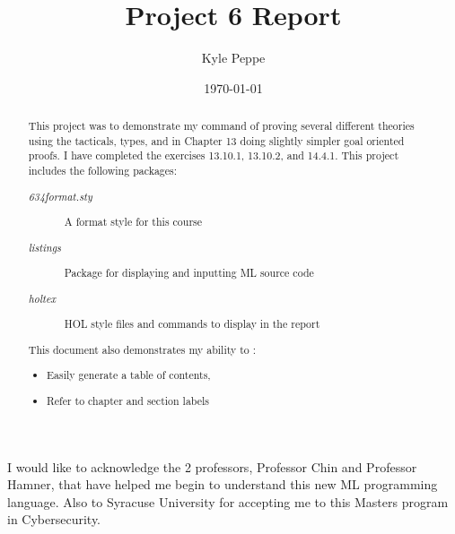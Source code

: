 \documentclass{report}
\title{Project 6 Report}
\author{Kyle Peppe}
\date{\today}
\begin{document}
\lstset{language=ML}


\maketitle{}

\begin{abstract}
  This project was to demonstrate my command of proving several
  different theories using the tacticals, types, and in Chapter 13
  doing slightly simpler goal oriented proofs. I have completed the
  exercises 13.10.1, 13.10.2, and 14.4.1.
        This project includes the following packages:
	\begin{description}
		\item[\emph{634format.sty}] A format style for this course
		\item[\emph{listings}] Package for displaying and inputting ML source code
		\item[\emph{holtex}] HOL style files and commands to display in the report
	\end{description}
        This document also demonstrates my ability to :
	\begin{itemize}
		\item Easily generate a table of contents,
		\item Refer to chapter and section labels
	\end{itemize}
\end{abstract}

\tableofcontents{}

\begin{acknowledgments}
  I would like to acknowledge the 2 professors, Professor Chin and 
  Professor Hamner, that have helped me begin to understand this new
  ML programming language. Also to Syracuse University for accepting
  me to this Masters program in Cybersecurity.
\end{acknowledgments}
\end{document}
